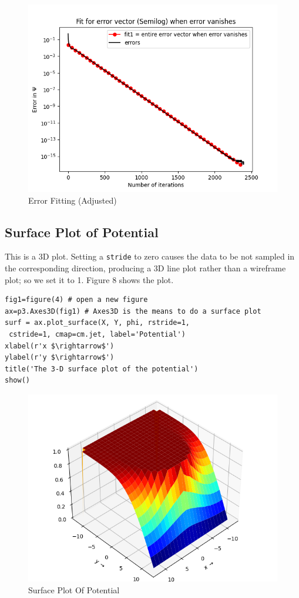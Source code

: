 \documentclass[11pt, a4paper]{article}
\begin{document}
\begin{figure}[!tbh]
   	\centering
  \includegraphics[scale=0.5]{errorcorrected.png} 
    \caption{Error Fitting (Adjusted)}
   	\label{fig:adjusted fitting}
   \end{figure}
  
\subsection{Surface Plot of Potential}
This is a 3D plot. Setting a \texttt{stride} to zero causes the data to be not sampled in the corresponding direction, producing a 3D line plot rather than a wireframe plot; so we set it to 1. Figure 8 shows the plot.

\begin{verbatim}
fig1=figure(4) # open a new figure
ax=p3.Axes3D(fig1) # Axes3D is the means to do a surface plot
surf = ax.plot_surface(X, Y, phi, rstride=1,
 cstride=1, cmap=cm.jet, label='Potential')
xlabel(r'x $\rightarrow$')
ylabel(r'y $\rightarrow$')
title('The 3-D surface plot of the potential')
show()
\end{verbatim}

\begin{figure}[!tbh]
   	\centering
  \includegraphics[scale=0.5]{Q4.png} 
    \caption{Surface Plot Of Potential}
   	\label{fig:surface plot potential)}
   \end{figure}
   
\end{document}
